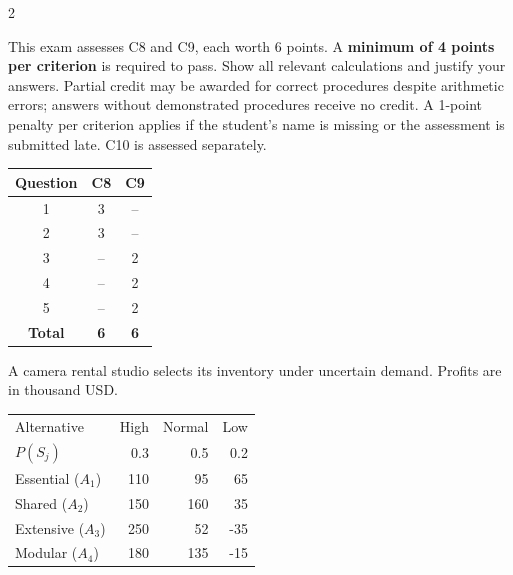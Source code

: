 	\begin{multicols}{2}
		\raggedcolumns
		
		This exam assesses C8 and C9, each worth 6 points. A \textbf{minimum of 4 points per criterion} is required to pass. Show all relevant calculations and justify your answers. Partial credit may be awarded for correct procedures despite arithmetic errors; answers without demonstrated procedures receive no credit. A 1-point penalty per criterion applies if the student's name is missing or the assessment is submitted late. C10 is assessed separately.
		
		\vspace{-3mm}
		\begin{center}
			\begin{tabular}{|c|c|c|}
				\hline
				\textbf{Question} & \textbf{C8} & \textbf{C9} \\ \hline
				1 & 3 & -- \\ \hline
				2 & 3 & -- \\ \hline
				3 & -- & 2 \\ \hline
				4 & -- & 2 \\ \hline
				5 & -- & 2 \\ \hline
				\textbf{Total} & \textbf{6} & \textbf{6} \\ \hline
			\end{tabular}
		\end{center}
		\vspace{-3mm}
		
		
A camera rental studio selects its inventory under uncertain demand. Profits are in thousand USD.

\vspace{-3mm}
\begin{center}\small\setlength{\tabcolsep}{4pt}
	\begin{tabular}{lrrr}\toprule
		Alternative & High & Normal & Low\\
		$P(S_j)$ & 0.3 & 0.5 & 0.2\\ \midrule
				Essential ($A_1$) & 110 & 95 & 65\\
		Shared ($A_2$) & 150 & 160 & 35\\
		Extensive ($A_3$) & 250 & 52 & -35\\
		Modular ($A_4$) & 180 & 135 & -15\\
		\bottomrule
	\end{tabular}
\end{center} \vspace*{-3mm}


\end{multicols}
